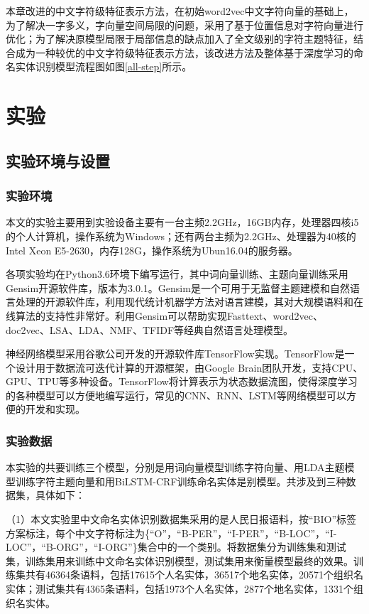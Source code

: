 \documentclass[winfonts,master,oneside,nobackinfo]{njuthesis}
\begin{document}
本章改进的中文字符级特征表示方法，在初始word2vec中文字符向量的基础上，为了解决一字多义，字向量空间局限的问题，采用了基于位置信息对字符向量进行优化；为了解决原模型局限于局部信息的缺点加入了全文级别的字符主题特征，结合成为一种较优的中文字符级特征表示方法，该改进方法及整体基于深度学习的命名实体识别模型流程图如图\ref{all-step}所示。



\section{实验}

\subsection{实验环境与设置}

\subsubsection{实验环境}

本文的实验主要用到实验设备主要有一台主频2.2GHz，16GB内存，处理器四核i5的个人计算机，操作系统为Windows；还有两台主频为2.2GHz、处理器为40核的Intel Xeon E5-2630，内存128G，操作系统为Ubun16.04的服务器。

各项实验均在Python3.6环境下编写运行，其中词向量训练、主题向量训练采用Gensim开源软件库，版本为3.0.1。Gensim是一个可用于无监督主题建模和自然语言处理的开源软件库，利用现代统计机器学方法对语言建模，其对大规模语料和在线算法的支持性非常好。利用Gensim可以帮助实现Fasttext、word2vec、doc2vec、LSA、LDA、NMF、TFIDF等经典自然语言处理模型。

神经网络模型采用谷歌公司开发的开源软件库TensorFlow\cite{TensorFlow}实现。TensorFlow是一个设计用于数据流可迭代计算的开源框架，由Google Brain团队开发，支持CPU、GPU、TPU等多种设备。TensorFlow将计算表示为状态数据流图，使得深度学习的各种模型可以方便地编写运行，常见的CNN、RNN、LSTM等网络模型可以方便的开发和实现。

\subsubsection{实验数据}

本实验的共要训练三个模型，分别是用词向量模型训练字符向量、用LDA主题模型训练字符主题向量和用BiLSTM-CRF训练命名实体是别模型。共涉及到三种数据集，具体如下：

（1）本文实验里中文命名实体识别数据集采用的是人民日报语料，按“BIO”标签方案标注，每个中文字符标注为\{“O”，“B-PER”，“I-PER”，“B-LOC”，“I-LOC”，“B-ORG”，“I-ORG”\}集合中的一个类别。将数据集分为训练集和测试集，训练集用来训练中文命名实体识别模型，测试集用来衡量模型最终的效果。训练集共有46364条语料，包括17615个人名实体，36517个地名实体，20571个组织名实体；测试集共有4365条语料，包括1973个人名实体，2877个地名实体，1331个组织名实体。
\end{document}
